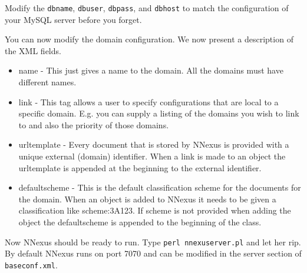 \documentclass[10pt]{article}
\begin{document}
\begin{enumerate}
Modify the \texttt{dbname}, \texttt{dbuser}, \texttt{dbpass}, and \texttt{dbhost} to match the configuration of your MySQL server before you forget.

You can now modify the domain configuration. We now present a description of the XML fields.
\begin{itemize}
\item name - This just gives a name to the domain. All the domains must have different names.
\item link - This tag allows a user to specify configurations that are local
to a specific domain. E.g. you can supply a listing of the domains you wish to
link to and also the priority of those domains.
\item urltemplate - Every document that is stored by NNexus is provided with a unique external (domain) 
identifier. When a link is made to an object the urltemplate is appended at the beginning to the external identifier.
\item defaultscheme - This is the default classification scheme for the documents for the domain. When an object is added to NNexus it needs to be given a classification like scheme:3A123. If scheme is not provided when adding the object the defaultscheme is appended to the beginning of the class.
\end{itemize}
\end{enumerate}

Now NNexus should be ready to run. Type \texttt{perl nnexuserver.pl} and let her rip. By default NNexus runs on port 7070 and can be modified in the server section of \verb#baseconf.xml#.
\end{document}
